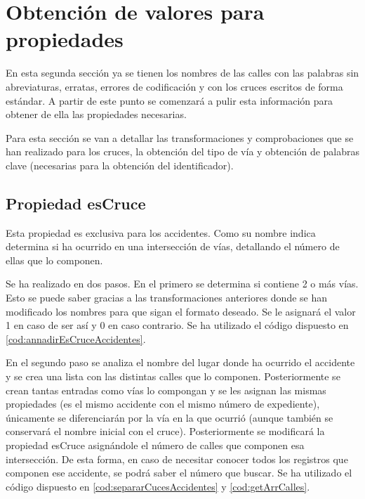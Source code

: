 \section{Obtención de valores para propiedades}

En esta segunda sección ya se tienen los nombres de las calles con las palabras sin abreviaturas, erratas, errores de codificación y con los cruces escritos de forma estándar. A partir de este punto se comenzará a pulir esta información para obtener de ella las propiedades necesarias.

Para esta sección se van a detallar las transformaciones y comprobaciones que se han realizado para los cruces, la obtención del tipo de vía y obtención de palabras clave (necesarias para la obtención del identificador).



\subsection{Propiedad esCruce}

Esta propiedad es exclusiva para los accidentes. Como su nombre indica determina si ha ocurrido en una intersección de vías, detallando el número de ellas que lo componen.

Se ha realizado en dos pasos. En el primero se determina si contiene 2 o más vías. Esto se puede saber gracias a las transformaciones anteriores donde se han modificado los nombres para que sigan el formato deseado. Se le asignará el valor 1 en caso de ser así y 0 en caso contrario. Se ha utilizado el código dispuesto en \ref{cod:annadirEsCruceAccidentes}.




En el segundo paso se analiza el nombre del lugar donde ha ocurrido el accidente y se crea una lista con las distintas calles que lo componen. Posteriormente se crean tantas entradas como vías lo compongan y se les asignan las mismas propiedades (es el mismo accidente con el mismo número de expediente), únicamente se diferenciarán por la vía en la que ocurrió (aunque también se conservará el nombre inicial con el cruce). Posteriormente se modificará la propiedad esCruce asignándole el número de calles que componen esa intersección. De esta forma, en caso de necesitar conocer todos los registros que componen ese accidente, se podrá saber el número que buscar. Se ha utilizado el código dispuesto en \ref{cod:separarCucesAccidentes} y \ref{cod:getArrCalles}.

